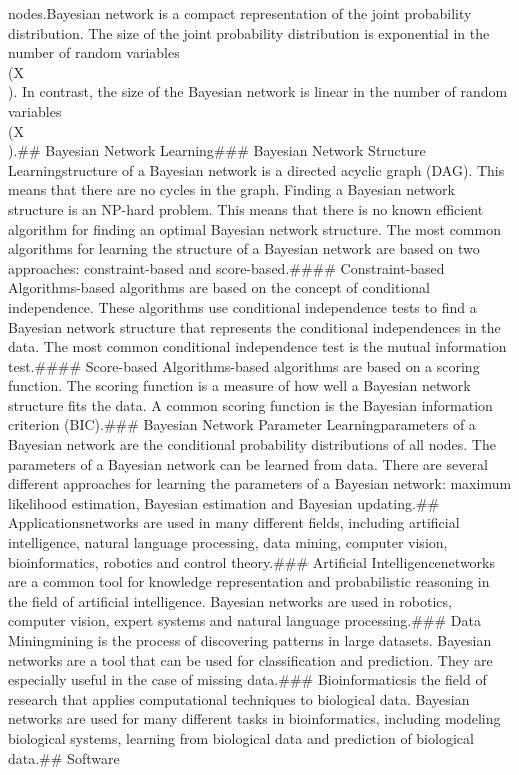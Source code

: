 nodes.\n\nThe Bayesian network is a compact representation of the joint probability distribution. The size of the joint probability distribution is exponential in the number of random variables \\(X\\). In contrast, the size of the Bayesian network is linear in the number of random variables \\(X\\).\n\n## Bayesian Network Learning\n\n### Bayesian Network Structure Learning\n\nThe structure of a Bayesian network is a directed acyclic graph (DAG). This means that there are no cycles in the graph. Finding a Bayesian network structure is an NP-hard problem. This means that there is no known efficient algorithm for finding an optimal Bayesian network structure. The most common algorithms for learning the structure of a Bayesian network are based on two approaches: constraint-based and score-based.\n\n#### Constraint-based Algorithms\n\nConstraint-based algorithms are based on the concept of conditional independence. These algorithms use conditional independence tests to find a Bayesian network structure that represents the conditional independences in the data. The most common conditional independence test is the mutual information test.\n\n#### Score-based Algorithms\n\nScore-based algorithms are based on a scoring function. The scoring function is a measure of how well a Bayesian network structure fits the data. A common scoring function is the Bayesian information criterion (BIC).\n\n### Bayesian Network Parameter Learning\n\nThe parameters of a Bayesian network are the conditional probability distributions of all nodes. The parameters of a Bayesian network can be learned from data. There are several different approaches for learning the parameters of a Bayesian network: maximum likelihood estimation, Bayesian estimation and Bayesian updating.\n\n## Applications\n\nBayesian networks are used in many different fields, including artificial intelligence, natural language processing, data mining, computer vision, bioinformatics, robotics and control theory.\n\n### Artificial Intelligence\n\nBayesian networks are a common tool for knowledge representation and probabilistic reasoning in the field of artificial intelligence. Bayesian networks are used in robotics, computer vision, expert systems and natural language processing.\n\n### Data Mining\n\nData mining is the process of discovering patterns in large datasets. Bayesian networks are a tool that can be used for classification and prediction. They are especially useful in the case of missing data.\n\n### Bioinformatics\n\nBioinformatics is the field of research that applies computational techniques to biological data. Bayesian networks are used for many different tasks in bioinformatics, including modeling biological systems, learning from biological data and prediction of biological data.\n\n## Software\n